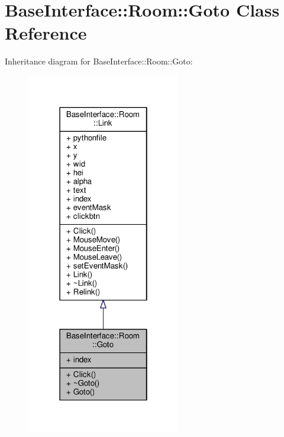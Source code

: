 \hypertarget{classBaseInterface_1_1Room_1_1Goto}{}\section{Base\+Interface\+:\+:Room\+:\+:Goto Class Reference}
\label{classBaseInterface_1_1Room_1_1Goto}


Inheritance diagram for Base\+Interface\+:\+:Room\+:\+:Goto\+:
\nopagebreak
\begin{figure}[H]
\begin{center}
\leavevmode
\includegraphics[width=190pt]{d3/d60/classBaseInterface_1_1Room_1_1Goto__inherit__graph}
\end{center}
\end{figure}


